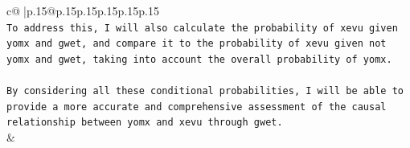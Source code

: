 \documentclass{article}
\begin{document}
{\begin{supertabular}{c@{$\;$}|p{.15\linewidth}@{}p{.15\linewidth}p{.15\linewidth}p{.15\linewidth}p{.15\linewidth}p{.15\linewidth}}
{{{\\ 
\texttt{To address this, I will also calculate the probability of xevu given yomx and gwet, and compare it to the probability of xevu given not yomx and gwet, taking into account the overall probability of yomx. } \\
\\ 
\texttt{By considering all these conditional probabilities, I will be able to provide a more accurate and comprehensive assessment of the causal relationship between yomx and xevu through gwet.} \\
            }
        }
    }
    & \\ \\

\end{supertabular}
}
\end{document}
